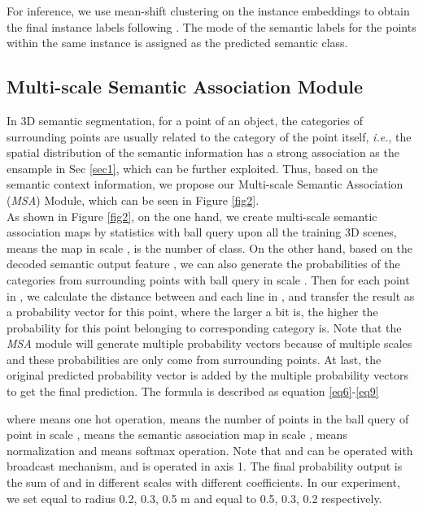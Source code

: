 \documentclass{cta-author}
\begin{document}
For inference, we use mean-shift clustering \cite{comaniciu2002mean} on the instance embeddings to obtain the final instance labels following \cite{wang2019associatively} .
The mode of the semantic labels for the points within the same instance is assigned as the predicted semantic class.
\subsection{Multi-scale Semantic Association Module}
\label{subsec:msa}
In 3D semantic segmentation, for a point of an object, the categories of surrounding points are usually related to the category of the point itself, \emph{i.e.}, the spatial distribution of the semantic information has a strong association as the ensample in Sec \ref{sec1}, which can be further exploited. Thus, based on the semantic context information, we propose our Multi-scale Semantic Association (\textit{MSA}) Module, which can be seen in Figure \ref{fig2}.\\
As shown in Figure \ref{fig2}, on the one hand, we create multi-scale semantic association maps by statistics with ball query upon all the training 3D scenes,  means the map in scale ,  is the number of class. On the other hand, based on the decoded semantic output feature , we can also generate the probabilities  of the categories from surrounding points with ball query in scale . Then for each point  in , we calculate the distance between  and each line in , and transfer the result as a probability vector for this point, where the larger a bit is, the higher the probability for this point belonging to corresponding category is. Note that the \textit{MSA} module will generate multiple probability vectors because of multiple scales and these probabilities are only come from surrounding points. At last, the original predicted probability vector is added by the multiple probability vectors to get the final prediction. The formula is described as equation \eqref{eq6}-\eqref{eq9}




where  means one hot operation,  means the number of points in the ball query of point  in scale ,  means the semantic association map in scale ,  means normalization and  means softmax operation. Note that 
 and  can be operated with broadcast mechanism, and  is operated in axis 1. The final probability output is the sum of  and  in different scales with different coefficients. In our experiment, we set  equal to radius 0.2, 0.3, 0.5 m and  equal to 0.5, 0.3, 0.2 respectively.
\end{document}
